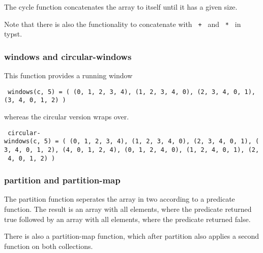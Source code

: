 The cycle function concatenates the array to itself until it has a given
size.

\begin{Shaded}
\begin{Highlighting}[]
\end{Highlighting}
\end{Shaded}

Note that there is also the functionality to concatenate with
\texttt{\ +\ } and \texttt{\ *\ } in typst.

\subsubsection{windows and
circular-windows}\label{windows-and-circular-windows}

This function provides a running window

\texttt{\ windows(c,\ 5)\ =\ (\ (0,\ 1,\ 2,\ 3,\ 4),\ (1,\ 2,\ 3,\ 4,\ 0),\ (2,\ 3,\ 4,\ 0,\ 1),\ (3,\ 4,\ 0,\ 1,\ 2)\ )\ }

whereas the circular version wraps over.

\texttt{\ circular-windows(c,\ 5)\ =\ (\ (0,\ 1,\ 2,\ 3,\ 4),\ (1,\ 2,\ 3,\ 4,\ 0),\ (2,\ 3,\ 4,\ 0,\ 1),\ (3,\ 4,\ 0,\ 1,\ 2),\ (4,\ 0,\ 1,\ 2,\ 4),\ (0,\ 1,\ 2,\ 4,\ 0),\ (1,\ 2,\ 4,\ 0,\ 1),\ (2,\ 4,\ 0,\ 1,\ 2)\ )\ }

\subsubsection{partition and
partition-map}\label{partition-and-partition-map}

The partition function seperates the array in two according to a
predicate function. The result is an array with all elements, where the
predicate returned true followed by an array with all elements, where
the predicate returned false.

\begin{Shaded}
\begin{Highlighting}[]
\end{Highlighting}
\end{Shaded}

There is also a partition-map function, which after partition also
applies a second function on both collections.

